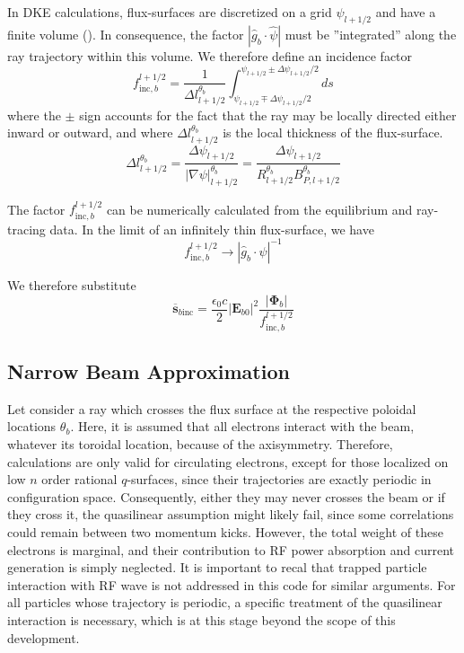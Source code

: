 In DKE calculations, flux-surfaces are discretized on a grid $\psi_{l+1/2}$
and have a finite volume (). In consequence, the factor $\left|  \widehat
{g}_{b}\cdot\widehat{\psi}\right|  $ must be ''integrated'' along the ray
trajectory within this volume. We therefore define an incidence factor
\begin{equation}
f_{\text{inc},b}^{l+1/2}=\frac{1}{\Delta l_{l+1/2}^{\theta_{b}}}\int
_{\psi_{l+1/2}\mp\Delta\psi_{l+1/2}/2}^{\psi_{l+1/2}\pm\Delta\psi_{l+1/2}/2}ds
\end{equation}
where the $\pm$ sign accounts for the fact that the ray may be locally
directed either inward or outward, and where $\Delta l_{l+1/2}^{\theta_{b}}$
is the local thickness of the flux-surface.
\begin{equation}
\Delta l_{l+1/2}^{\theta_{b}}=\frac{\Delta\psi_{l+1/2}}{\left|  \nabla
\psi\right|  _{l+1/2}^{\theta_{b}}}=\frac{\Delta\psi_{l+1/2}}{R_{l+1/2}%
^{\theta_{b}}B_{P,l+1/2}^{\theta_{b}}}%
\end{equation}

The factor $f_{\text{inc},b}^{l+1/2}$ can be numerically calculated from the
equilibrium and ray-tracing data. In the limit of an infinitely thin
flux-surface, we have
\begin{equation}
f_{\text{inc},b}^{l+1/2}\rightarrow\left|  \widehat{g}_{b}\cdot\widehat{\psi
}\right|  ^{-1}%
\end{equation}

We therefore substitute%
\begin{equation}
\overline{\mathbf{s}}_{b\text{inc}}=\frac{\epsilon_{0}c}{2}\left|
\mathbf{E}_{b0}\right|  ^{2}\frac{\left|  \mathbf{\Phi}_{b}\right|
}{f_{\text{inc},b}^{l+1/2}} \label{sbinc}%
\end{equation}

\subsection{Narrow Beam Approximation}

Let consider a ray which crosses the flux surface at the respective poloidal
locations $\theta_{b}$. Here, it is assumed that all electrons interact with
the beam, whatever its toroidal location, because of the axisymmetry.
Therefore, calculations are only valid for circulating electrons, except for
those localized on low $n$ order rational $q$-surfaces, since their
trajectories are exactly periodic in configuration space. Consequently, either
they may never crosses the beam or if they cross it, the quasilinear
assumption might likely fail, since some correlations could remain between two
momentum kicks. However, the total weight of these electrons is marginal, and
their contribution to RF power absorption and current generation is simply
neglected. It is important to recal that trapped particle interaction with RF
wave is not addressed in this code for similar arguments. For all particles
whose trajectory is periodic, a specific treatment of the quasilinear
interaction is necessary, which is at this stage beyond the scope of this development.

